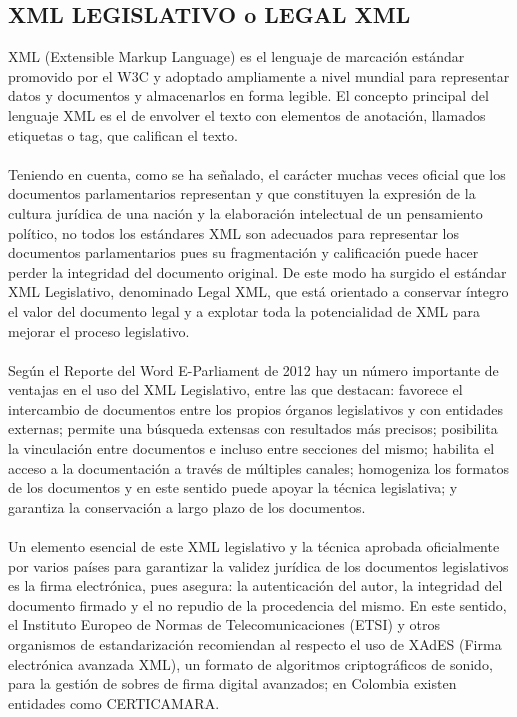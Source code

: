 \documentclass[conference]{IEEEtran}
\begin{document}
 \subsection{XML LEGISLATIVO o LEGAL XML}  
   XML (Extensible Markup Language) es el lenguaje de marcación estándar promovido por el W3C y adoptado ampliamente a nivel mundial para representar datos y documentos y almacenarlos en forma legible. El concepto principal del lenguaje XML es el de envolver el texto con elementos de anotación, llamados etiquetas o tag, que califican el texto. \\ \\
   Teniendo en cuenta, como se ha señalado, el carácter muchas veces oficial que los documentos parlamentarios representan y que constituyen la expresión de la cultura jurídica de una nación y la elaboración intelectual de un pensamiento político, no todos los estándares XML son adecuados para representar los documentos parlamentarios pues su fragmentación y calificación puede hacer perder la integridad del documento original. De este modo ha surgido el estándar XML Legislativo, denominado Legal XML, que está orientado a conservar íntegro el valor del documento legal y a explotar toda la potencialidad de XML para mejorar el proceso legislativo. \\ \\
   Según el Reporte del Word E-Parliament de 2012 hay un número importante de ventajas en el uso del XML Legislativo, entre las que destacan: favorece el intercambio de documentos entre los propios órganos legislativos y con entidades externas; permite una búsqueda extensas con resultados más precisos; posibilita la vinculación entre documentos e incluso entre secciones del mismo; habilita el acceso a la documentación a través de múltiples canales; homogeniza los formatos de los documentos y en este sentido puede apoyar la técnica legislativa; y garantiza la conservación a largo plazo de los documentos. \\ \\
   Un elemento esencial de este XML legislativo y la técnica aprobada oficialmente por varios países para garantizar la validez jurídica de los documentos legislativos es la firma electrónica, pues asegura: la autenticación del autor, la integridad del documento firmado y el no repudio de la procedencia del mismo. En este sentido, el Instituto Europeo de Normas de Telecomunicaciones (ETSI) y otros organismos de estandarización recomiendan al respecto el uso de XAdES (Firma electrónica avanzada XML), un formato de algoritmos criptográficos de sonido, para la gestión de sobres de firma digital avanzados; en Colombia existen entidades como CERTICAMARA. 
   
\end{document}
